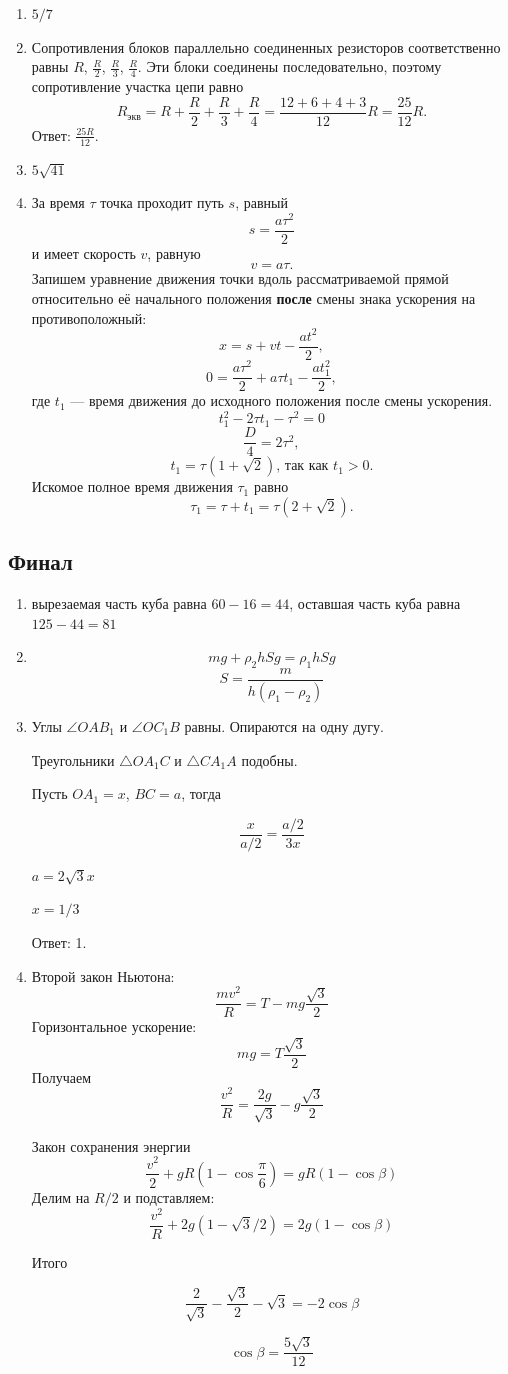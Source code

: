 \documentclass[12pt]{article} %
\begin{document}
\begin{enumerate}
\item $5/7$
\item Сопротивления блоков параллельно соединенных резисторов соответственно равны $R$, $\frac{R}{2}$, $\frac{R}{3}$, $\frac{R}{4}$. Эти блоки соединены последовательно, поэтому сопротивление участка цепи равно
\[
    R_{\text{экв}} = R + \frac{R}{2} + \frac{R}{3} + \frac{R}{4} = \frac{12+6+4+3}{12}R = \frac{25}{12}R.
\]
Ответ: $\frac{25R}{12}$.
\item $5\sqrt{41}$ 
\item         За время $\tau$ точка проходит путь $s$, равный
\[
    s = \frac{a\tau ^2}{2}
\]
и имеет скорость $v$, равную
\[
    v = a \tau.
\]
Запишем уравнение движения точки вдоль рассматриваемой прямой относительно её начального положения \textbf{после} смены знака ускорения на противоположный:
\[
    x = s + vt - \frac{at^2}{2},
\]
\[
    0 = \frac{a\tau ^2}{2} + a \tau t_1 - \frac{at_1^2}{2},
\]
где $t_1$ — время движения до исходного положения после смены ускорения.
\[
    t_1^2 - 2\tau t_1 - \tau ^2 = 0
\]
\[
    \frac{D}{4} =2 \tau ^2,
\]
\[
    t_1 = \tau (1 + \sqrt{2})\text{, так как $t_1 > 0$}.
\]
Искомое полное время движения $\tau _1$ равно 
\[
    \tau _1 = \tau + t_1 = \tau (2 + \sqrt{2}).
\]
\end{enumerate}
    
\subsection*{Финал}

\begin{enumerate}
\item вырезаемая часть куба равна $60 - 16 = 44$, оставшая часть куба равна  $125 - 44 = 81$
\item 
\[ 
    mg + \rho_2 h Sg = \rho_1 h S g
\]
\[
    S = \frac{m}{h(\rho_1 - \rho_2)}
\]
\item Углы $\angle OAB_1$ и $\angle OC_1B$ равны. Опираются на одну дугу. 

Треугольники $\triangle OA_1C$ и $\triangle CA_1A$ подобны.

Пусть $OA_1 = x$, $BC = a$, тогда 

\[
\frac{x}{a/2} = \frac{a/2}{3x}  
\]

$a = 2\sqrt{3}x$

$x=1/3$

Ответ: 1.

\item Второй закон Ньютона:
\[
\frac{mv^2}{R} = T - mg \frac{\sqrt{3}}{2} 
\]
Горизонтальное ускорение:
\[
mg = T \frac{\sqrt{3}}{2}  
\]
Получаем 
\[
\frac{v^2}{R} = \frac{2g}{\sqrt{3}} - g \frac{\sqrt{3}}{2}  
\]

Закон сохранения энергии
\[
\frac{v^2}{2} +gR\left(1- \cos \frac{\pi}{6} \right)  = gR(1-\cos\beta)  
\]
Делим на $R/2$ и подставляем:
\[
\frac{v^2}{R} +2g(1- \sqrt{3}/2)  = 2g(1-\cos\beta)  
\]

Итого

\[
\frac{2}{\sqrt{3}} - \frac{\sqrt{3}}{2} - \sqrt{3} = -2\cos\beta  
\]

\[
\cos\beta = \frac{5\sqrt{3}}{12}
\]

\end{enumerate} 
  
\end{document}
